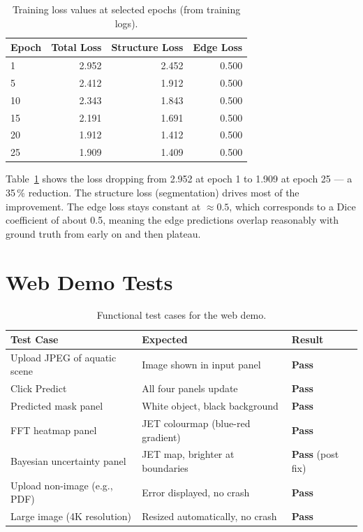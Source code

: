 \documentclass[12pt,a4paper]{report}
\begin{document}
\begin{table}[H]
\centering
\caption{Training loss values at selected epochs (from training logs).}
\label{tab:loss}
\begin{tabular}{@{}lrrr@{}}
\toprule
\textbf{Epoch} & \textbf{Total Loss} & \textbf{Structure Loss} & \textbf{Edge Loss} \\
\midrule
 1 & 2.952 & 2.452 & 0.500 \\
 5 & 2.412 & 1.912 & 0.500 \\
10 & 2.343 & 1.843 & 0.500 \\
15 & 2.191 & 1.691 & 0.500 \\
20 & 1.912 & 1.412 & 0.500 \\
25 & 1.909 & 1.409 & 0.500 \\
\bottomrule
\end{tabular}
\end{table}

\noindent Table~\ref{tab:loss} shows the loss dropping from 2.952 at epoch 1 to 1.909 at epoch 25 — a 35\,\% reduction. The structure loss (segmentation) drives most of the improvement. The edge loss stays constant at $\approx 0.5$, which corresponds to a Dice coefficient of about 0.5, meaning the edge predictions overlap reasonably with ground truth from early on and then plateau.

\section{Web Demo Tests}

\begin{table}[H]
\centering
\caption{Functional test cases for the web demo.}
\label{tab:webtest}
\begin{tabular}{@{}lll@{}}
\toprule
\textbf{Test Case} & \textbf{Expected} & \textbf{Result} \\
\midrule
Upload JPEG of aquatic scene         & Image shown in input panel        & \textbf{Pass} \\
Click Predict                        & All four panels update            & \textbf{Pass} \\
Predicted mask panel                 & White object, black background    & \textbf{Pass} \\
FFT heatmap panel                    & JET colourmap (blue-red gradient) & \textbf{Pass} \\
Bayesian uncertainty panel           & JET map, brighter at boundaries   & \textbf{Pass} (post fix) \\
Upload non-image (e.g., PDF)         & Error displayed, no crash         & \textbf{Pass} \\
Large image (4K resolution)          & Resized automatically, no crash   & \textbf{Pass} \\
\bottomrule
\end{tabular}
\end{table}
\end{document}

